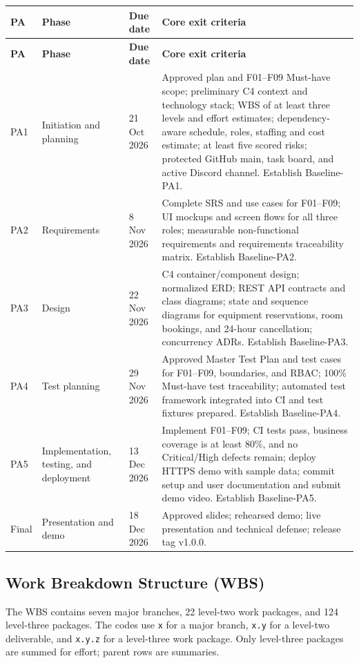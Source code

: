 \documentclass[11pt]{article}
\begin{document}
\begin{longtable}{@{}L{1.1cm}L{3.0cm}L{2.2cm}L{9.1cm}@{}}
\toprule
\textbf{PA} & \textbf{Phase} & \textbf{Due date} & \textbf{Core exit criteria} \\
\midrule
\endfirsthead
\toprule
\textbf{PA} & \textbf{Phase} & \textbf{Due date} & \textbf{Core exit criteria} \\
\midrule
\endhead
PA1 & Initiation and planning & 21 Oct 2026 & Approved plan and F01--F09 Must-have scope; preliminary C4 context and technology stack; WBS of at least three levels and effort estimates; dependency-aware schedule, roles, staffing and cost estimate; at least five scored risks; protected GitHub main, task board, and active Discord channel. Establish Baseline-PA1. \\
PA2 & Requirements & 8 Nov 2026 & Complete SRS and use cases for F01--F09; UI mockups and screen flows for all three roles; measurable non-functional requirements and requirements traceability matrix. Establish Baseline-PA2. \\
PA3 & Design & 22 Nov 2026 & C4 container/component design; normalized ERD; REST API contracts and class diagrams; state and sequence diagrams for equipment reservations, room bookings, and 24-hour cancellation; concurrency ADRs. Establish Baseline-PA3. \\
PA4 & Test planning & 29 Nov 2026 & Approved Master Test Plan and test cases for F01--F09, boundaries, and RBAC; 100\% Must-have test traceability; automated test framework integrated into CI and test fixtures prepared. Establish Baseline-PA4. \\
PA5 & Implementation, testing, and deployment & 13 Dec 2026 & Implement F01--F09; CI tests pass, business coverage is at least 80\%, and no Critical/High defects remain; deploy HTTPS demo with sample data; commit setup and user documentation and submit demo video. Establish Baseline-PA5. \\
Final & Presentation and demo & 18 Dec 2026 & Approved slides; rehearsed demo; live presentation and technical defense; release tag v1.0.0. \\
\bottomrule
\end{longtable}

\subsection{Work Breakdown Structure (WBS)}
The WBS contains seven major branches, 22 level-two work packages, and 124 level-three packages. The codes use \texttt{x} for a major branch, \texttt{x.y} for a level-two deliverable, and \texttt{x.y.z} for a level-three work package. Only level-three packages are summed for effort; parent rows are summaries.
\end{document}
